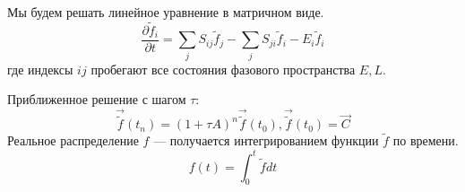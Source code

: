 Мы будем решать линейное уравнение в матричном виде.
\begin{equation*}
	\frac{\partial \widetilde{f}_i}{\partial t} = \sum_j S_{ij}\widetilde{f}_j - \sum_j S_{ji} \widetilde{f}_i - E_i \widetilde{f}_i
\end{equation*}
где индексы $ij$ пробегают все состояния фазового пространства $E,L$.

Приближенное решение с шагом $\tau$:
\begin{equation*}
	\vec{\widetilde{f}}(t_n) = (1+\tau A)^n \vec{\widetilde{f}}(t_0),
	 \vec{\widetilde{f}}(t_0) = \vec{C}
\end{equation*}
Реальное распределение $f$ --- получается интегрированием функции $\widetilde{f}$ по времени.
\begin{equation*}
	f(t) = \int_0^t \widetilde{f} dt
\end{equation*}

